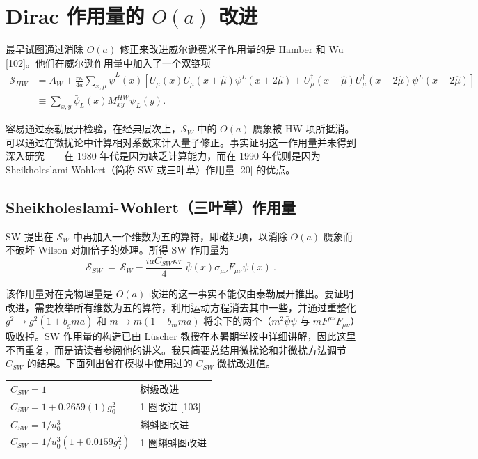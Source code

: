 \chapter{Dirac 作用量的 $O(a)$ 改进}

最早试图通过消除 $O(a)$ 修正来改进威尔逊费米子作用量的是 Hamber 和 Wu [102]。他们在威尔逊作用量中加入了一个双链项
\begin{align}
\mathcal{S}_{HW}
&= A_W + \frac{r\kappa}{4a} \sum_{x,\mu} \bar{\psi}^L(x)
   \left[ U_\mu (x) U_\mu (x+\hat{\mu}) \psi^L (x+2\hat{\mu})
   + U_\mu^\dagger (x-\hat{\mu}) U_\mu^\dagger (x-2\hat{\mu}) \psi^L (x-2\hat{\mu}) \right] \nonumber\\
&\equiv \sum_{x,y} \bar{\psi}_L (x) M_{xy}^{HW} \psi_L (y) .
\label{eq:HWaction}
\end{align}

容易通过泰勒展开检验，在经典层次上，$\mathcal{S}_W$ 中的 $O(a)$ 赝象被 HW 项所抵消。可以通过在微扰论中计算相对系数来计入量子修正。事实证明这一作用量并未得到深入研究——在 1980 年代是因为缺乏计算能力，而在 1990 年代则是因为 Sheikholeslami-Wohlert（简称 SW 或三叶草）作用量 [20] 的优点。

\section{Sheikholeslami-Wohlert（三叶草）作用量}

SW 提出在 $\mathcal{S}_W$ 中再加入一个维数为五的算符，即磁矩项，以消除 $O(a)$ 赝象而不破坏 Wilson 对加倍子的处理。所得 SW 作用量为
\begin{equation}
\mathcal{S}_{SW} \ = \ \mathcal{S}_W -
   \frac{i a C_{SW} \kappa r}{4}\ \bar{\psi}(x) \sigma_{\mu\nu} F_{\mu\nu} \psi(x) \ .
\label{eq:SWact}
\end{equation}

该作用量对在壳物理量是 $O(a)$ 改进的这一事实不能仅由泰勒展开推出。要证明改进，需要枚举所有维数为五的算符，利用运动方程消去其中一些，并通过重整化 $g^2 \to g^2 (1+b_g ma)$ 和 $m \to m (1+b_m ma)$ 将余下的两个（$m^2 \bar{\psi}\psi$ 与 $m F^{\mu\nu} F_{\mu\nu}$）吸收掉。SW 作用量的构造已由 L\"uscher 教授在本暑期学校中详细讲解，因此这里不再重复，而是请读者参阅他的讲义。我只简要总结用微扰论和非微扰方法调节 $C_{SW}$ 的结果。下面列出曾在模拟中使用过的 $C_{SW}$ 微扰改进值。

\begin{center}
\begin{tabular}{ll}
$C_{SW} = 1$                                & 树级改进 \\
$C_{SW} = 1 + 0.2659(1) g_0^2$              & 1 圈改进 [103] \\
$C_{SW} = 1/u_0^3$                          & 蝌蚪图改进 \\
$C_{SW} = 1/u_0^3 (1 + 0.0159 g_I^2)$       & 1 圈蝌蚪图改进 \\
\end{tabular}
\end{center}


